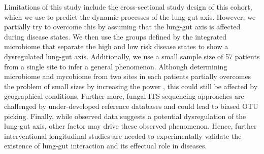 Limitations of this study include the cross-sectional study design of this cohort, which we use to predict the dynamic processes of the lung-gut axis. However, we partially try to overcome this by assuming that the lung-gut axis is affected during disease states. We then use the groups defined by the integrated microbiome that separate the high and low risk disease states to show a dysregulated lung-gut axis. Additionally, we use a small sample size of 57 patients from a single site to infer a general phenomenon. Although determining microbiome and mycobiome from two sites in each patients partially overcomes the problem of small sizes by increasing the power \cite{Li2018}, this could still be affected by geographical conditions. Further more, fungal ITS sequencing approaches are challenged by under-developed reference databases and could lead to biased OTU picking. Finally, while observed data suggests a potential dysregulation of the lung-gut axis, other factor may drive these observed phenomenon. Hence, further interventional longitudinal studies are needed to experimentally validate the existence of lung-gut interaction and its effectual role in diseases.
